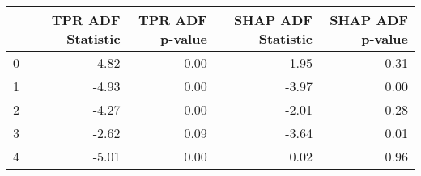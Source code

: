 \begin{tabular}{lrrrr}
\toprule
 & TPR ADF Statistic & TPR ADF p-value & SHAP ADF Statistic & SHAP ADF p-value \\
\midrule
0 & -4.82 & 0.00 & -1.95 & 0.31 \\
1 & -4.93 & 0.00 & -3.97 & 0.00 \\
2 & -4.27 & 0.00 & -2.01 & 0.28 \\
3 & -2.62 & 0.09 & -3.64 & 0.01 \\
4 & -5.01 & 0.00 & 0.02 & 0.96 \\
\bottomrule
\end{tabular}
